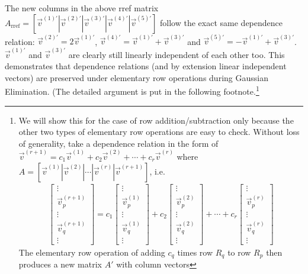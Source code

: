 The new columns in the above rref matrix $A_{\text{rref}} = [\vec{v}^{(1)'}|\vec{v}^{(2)'}|\vec{v}^{(3)'}|\vec{v}^{(4)'}|\vec{v}^{(5)'}]$ follow the exact same dependence relation: $\vec{v}^{(2)'} = 2\vec{v}^{(1)'}$, $\vec{v}^{(4)'} = \vec{v}^{(1)'} + \vec{v}^{(3)'}$ and $\vec{v}^{(5)'} = -\vec{v}^{(1)'} + \vec{v}^{(3)'}$. $\vec{v}^{(1)'}$ and $\vec{v}^{(3)'}$ are clearly still linearly independent of each other too. This demonstrates that dependence relations (and by extension linear independent vectors) are preserved under elementary row operations during Gaussian Elimination. (The detailed argument is put in the following footnote.\footnote{We will show this for the case of row addition/subtraction only because the other two types of elementary row operations are easy to check. Without loss of generality, take a dependence relation in the form of $\vec{v}^{(r+1)} = c_1\vec{v}^{(1)} + c_2\vec{v}^{(2)} + \cdots + c_r\vec{v}^{(r)}$ where $A=[\vec{v}^{(1)}|\vec{v}^{(2)}|\cdots|\vec{v}^{(r)}|\vec{v}^{(r+1)}]$, i.e. \begin{align*}
\begin{bmatrix}
\vdots \\
\vec{v}_p^{(r+1)} \\
\vdots \\
\vec{v}_q^{(r+1)} \\
\vdots
\end{bmatrix}
= c_1
\begin{bmatrix}
\vdots \\
\vec{v}_p^{(1)} \\
\vdots \\
\vec{v}_q^{(1)} \\
\vdots
\end{bmatrix}
+ c_2
\begin{bmatrix}
\vdots \\
\vec{v}_p^{(2)} \\
\vdots \\
\vec{v}_q^{(2)} \\
\vdots
\end{bmatrix} + \cdots + 
c_r
\begin{bmatrix}
\vdots \\
\vec{v}_p^{(r)} \\
\vdots \\
\vec{v}_q^{(r)} \\
\vdots
\end{bmatrix}
\end{align*}
The elementary row operation of adding $c_q$ times row $R_q$ to row $R_p$ then produces a new matrix $A'$ with column vectors
}
